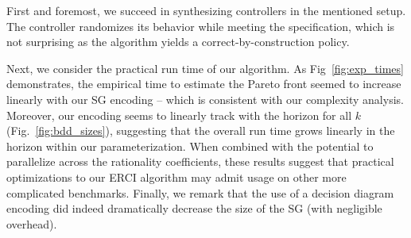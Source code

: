  First and foremost, we succeed in synthesizing
controllers in the mentioned setup.  The controller randomizes its
behavior while meeting the specification, which is not surprising as
the algorithm yields a correct-by-construction policy.

Next, we consider the practical run time of our algorithm.  As
Fig~\ref{fig:exp_times} demonstrates, the empirical time to estimate
the Pareto front seemed to increase linearly with our SG 
encoding -- which is consistent with our complexity analysis.
Moreover, our encoding seems to linearly track with the horizon for
all $k$ (Fig.~\ref{fig:bdd_sizes}), suggesting that the overall run
time grows linearly in the horizon within our parameterization. When
combined with the potential to parallelize across the rationality
coefficients, these results suggest that practical optimizations to
our ERCI algorithm may admit usage on other more complicated
benchmarks. Finally, we remark that the use of a decision diagram
encoding did indeed dramatically decrease the size of the SG 
(with negligible overhead).\footnotemark







